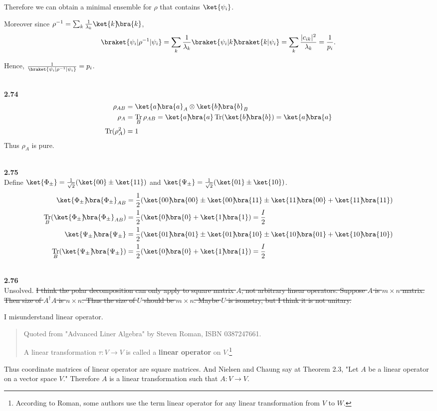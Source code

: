 \documentclass[10pt]{book}
\DeclareMathOperator{\Tr}{Tr}
\newcommand{\kb}[1]{\ket{#1}\hspace{-1mm} \bra{#1}} %
\newcommand{\kbt}[2]{\ket{#1}\hspace{-1mm} \bra{#2}} %
\newcommand{\Textbf}[1]{\hspace{3mm}\\ \textbf{#1}\\}
\begin{document}
	Therefore we can obtain a minimal ensemble for $\rho$ that contains $\ket{\psi_i}$.
	
	Moreover since $\rho^{-1} = \sum_k \frac{1}{\lambda_k} \kb{k}$,
	\begin{equation}
\begin{aligned}
		\braket{\psi_i | \rho^{-1} | \psi_i} = \sum_k \frac{1}{\lambda_k} \braket{\psi_i | k} \hspace{-1mm} \braket{k | \psi_i} = \sum_k \frac{|c_{ik}|^2}{\lambda_k} = \frac{1}{p_i}.
	\end{aligned}
\end{equation}
	
	Hence, $ \frac{1}{\braket{\psi_i | \rho^{-1} | \psi_i}} = p_i $.
	
	
	\Textbf{2.74}
	\begin{equation}
\begin{aligned}
		\rho_{AB} &= \kb{a}_A \otimes \kb{b}_B\\
		\rho_A &= \Tr_{B} \rho_{AB} = \kb{a} \Tr (\kb{b}) = \kb{a}\\
		\Tr (\rho_A^2) &= 1
	\end{aligned}
\end{equation}
	Thus $\rho_A$ is pure.
	
	
	\Textbf{2.75}
	Define $\ket{\Phi_\pm} = \frac{1}{\sqrt{2}} (\ket{00} \pm \ket{11})$ and $\ket{\Psi_\pm} = \frac{1}{\sqrt{2}} (\ket{01} \pm \ket{10})$.
	\begin{equation}
\begin{aligned}
		\kb{\Phi_\pm}_{AB} &= \frac{1}{2} (\kb{00} \pm \kbt{00}{11} \pm \kbt{11}{00} + \kb{11})\\
		\Tr_B (\kb{\Phi_\pm}_{AB}) &= \frac{1}{2} (\kb{0} + \kb{1}) = \frac{I}{2}\\
		\kb{\Psi_\pm} &= \frac{1}{2} (\kb{01} \pm \kbt{01}{10} \pm \kbt{10}{01} + \kb{10})\\
		\Tr_B (\kb{\Psi_\pm}) &= \frac{1}{2} (\kb{0} + \kb{1}) = \frac{I}{2}
	\end{aligned}
\end{equation}
	
	
	\Textbf{2.76}
	
	Unsolved. \sout{I think the polar decomposition can only apply to square matrix $A$, not arbitrary linear operators.
		Suppose $A$ is $m \times n$ matrix. Then size of $A^\dagger A$ is $n \times n$. Thus the size of $U$ should be $m \times n$.
		Maybe $U$ is isometry, but I think it is not unitary.}
	
	I misunderstand linear operator.
	\begin{quote}
		Quoted from "Advanced Liner Algebra" by Steven Roman, ISBN 0387247661.
		
		A linear transformation $\tau : V \rightarrow V$ is called a \textbf{linear operator} on $V$.\footnote{According to Roman, some authors use the term linear operator for any linear transformation from $V$ to $W$.}
	\end{quote}
	Thus coordinate matrices of linear operator are square matrices. And Nielsen and Chaung say at Theorem 2.3, "Let $A$ be a linear operator on a vector space $V$." Therefore $A$ is a linear transformation such that $A : V \rightarrow V$.
	
\end{document}
